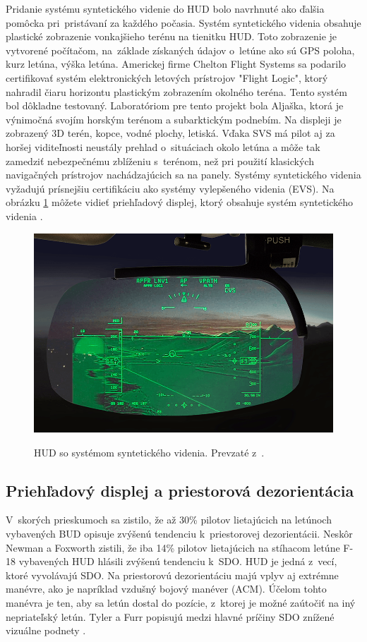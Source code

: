 Pridanie systému syntetického videnie do HUD bolo navrhnuté ako ďalšia pomôcka pri~pristávaní za každého počasia. Systém syntetického videnia obsahuje plastické zobrazenie vonkajšieho terénu na tienitku HUD. Toto zobrazenie je vytvorené počítačom, na~základe získaných údajov o~letúne ako sú GPS poloha, kurz letúna, výška letúna. Americkej firme Chelton Flight Systems sa podarilo certifikovať systém elektronických letových prístrojov "Flight Logic", ktorý nahradil čiaru horizontu plastickým zobrazením okolného teréna. Tento systém bol dôkladne testovaný. Laboratóriom pre tento projekt bola Aljaška, ktorá je výnimočná svojím horským terénom a subarktickým podnebím. Na displeji je zobrazený 3D terén, kopce, vodné plochy, letiská. Vďaka SVS má pilot aj za horšej viditeľnosti neustály prehlad o~situáciach okolo letúna a môže tak zamedziť nebezpečnému zblíženiu s~terénom, než pri použití klasických navigačných prístrojov nachádzajúcich sa na panely.
Systémy syntetického videnia vyžadujú prísnejšiu certifikáciu ako systémy vylepšeného videnia (EVS). Na obrázku \ref{svs} môžete vidieť priehľadový displej, ktorý obsahuje systém syntetického videnia \cite{svs}.

\begin{figure}[ht]
\centering
\includegraphics[scale=0.4]{obrazky-figures/SVS.png}
\caption{HUD so systémom syntetického videnia. Prevzaté z~\cite{fotoSv}.}{\label{svs}}
\end{figure}

\subsection{Priehľadový displej a priestorová dezorientácia}
V~skorých prieskumoch sa zistilo, že až 30\% pilotov lietajúcich na letúnoch vybavených BUD opisuje zvýšenú tendenciu k~priestorovej dezorientácii. Neskôr Newman a Foxworth zistili, že iba 14\% pilotov lietajúcich na stíhacom letúne F-18 vybavených HUD hlásili zvýšenú tendenciu k~SDO. HUD je jedná z~vecí, ktoré vyvolávajú SDO. Na priestorovú dezorientáciu majú vplyv aj extrémne manévre, ako je napríklad vzdušný bojový manéver (ACM). Účelom tohto manévra je ten, aby sa letún dostal do pozície, z~ktorej je možné zaútočiť na iný nepriateľský letún. Tyler a Furr popisujú medzi hlavné príčiny SDO znížené vizuálne podnety \cite{HUDkniha}.

